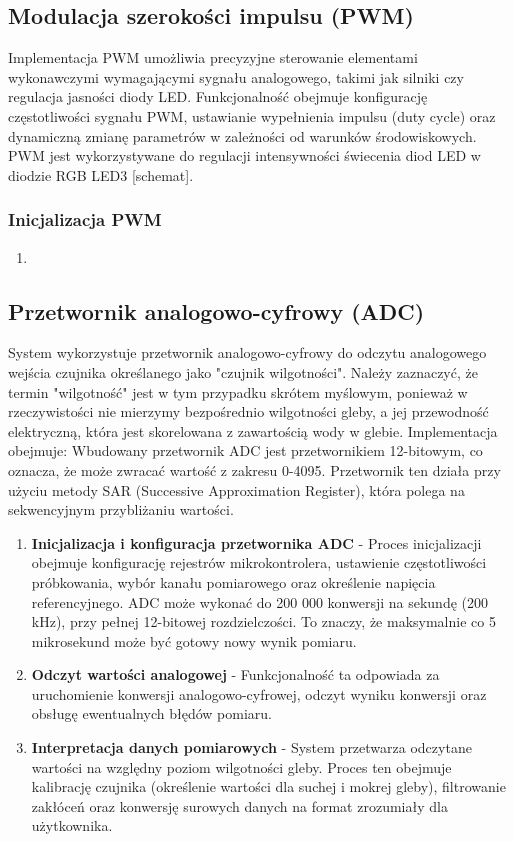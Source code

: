 \documentclass{article}
\begin{document}
\subsection{Modulacja szerokości impulsu (PWM)}
Implementacja PWM umożliwia precyzyjne sterowanie elementami wykonawczymi wymagającymi sygnału analogowego, takimi jak silniki czy regulacja jasności diody LED. Funkcjonalność obejmuje konfigurację częstotliwości sygnału PWM, ustawianie wypełnienia impulsu (duty cycle) oraz dynamiczną zmianę parametrów w zależności od warunków środowiskowych. PWM jest wykorzystywane do regulacji intensywności świecenia diod LED w diodzie RGB LED3 [schemat]. %

\subsubsection{Inicjalizacja PWM}
\begin{enumerate}
    \item 
\end{enumerate}








\subsection{Przetwornik analogowo-cyfrowy (ADC)}
\label{sec:ADC}
System wykorzystuje przetwornik analogowo-cyfrowy do odczytu analogowego wejścia czujnika określanego jako "czujnik wilgotności". Należy zaznaczyć, że termin "wilgotność" jest w tym przypadku skrótem myślowym, ponieważ w rzeczywistości nie mierzymy bezpośrednio wilgotności gleby, a jej przewodność elektryczną, która jest skorelowana z zawartością wody w glebie. Implementacja obejmuje:
Wbudowany przetwornik ADC jest przetwornikiem 12-bitowym, co oznacza, że może zwracać wartość z zakresu 0-4095. Przetwornik ten działa przy użyciu metody SAR (Successive Approximation Register), która polega na sekwencyjnym przybliżaniu wartości.
\begin{enumerate}
    \item \textbf{Inicjalizacja i konfiguracja przetwornika ADC} - Proces inicjalizacji obejmuje konfigurację rejestrów mikrokontrolera, ustawienie częstotliwości próbkowania, wybór kanału pomiarowego oraz określenie napięcia referencyjnego. ADC może wykonać do 200 000 konwersji na sekundę (200 kHz), przy pełnej 12-bitowej rozdzielczości. To znaczy, że maksymalnie co 5 mikrosekund może być gotowy nowy wynik pomiaru. 
    
    \item \textbf{Odczyt wartości analogowej} - Funkcjonalność ta odpowiada za uruchomienie konwersji analogowo-cyfrowej, odczyt wyniku konwersji oraz obsługę ewentualnych błędów pomiaru.
    
    \item \textbf{Interpretacja danych pomiarowych} - System przetwarza odczytane wartości na względny poziom wilgotności gleby. Proces ten obejmuje kalibrację czujnika (określenie wartości dla suchej i mokrej gleby), filtrowanie zakłóceń oraz konwersję surowych danych na format zrozumiały dla użytkownika.
\end{enumerate}
\end{document}
